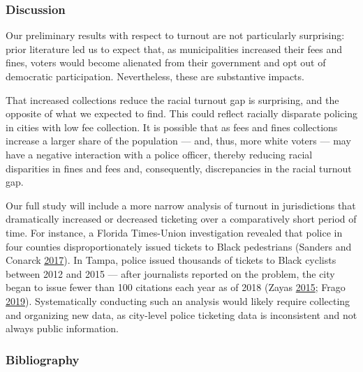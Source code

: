 \documentclass[
  12pt,
]{article}
\begin{document}
\hypertarget{discussion}{%
\subsubsection*{Discussion}\label{discussion}}

Our preliminary results with respect to turnout are not particularly surprising: prior literature led us to expect that, as municipalities increased their fees and fines, voters would become alienated from their government and opt out of democratic participation. Nevertheless, these are substantive impacts.

That increased collections reduce the racial turnout gap is surprising, and the opposite of what we expected to find. This could reflect racially disparate policing in cities with low fee collection. It is possible that as fees and fines collections increase a larger share of the population --- and, thus, more white voters --- may have a negative interaction with a police officer, thereby reducing racial disparities in fines and fees and, consequently, discrepancies in the racial turnout gap.

Our full study will include a more narrow analysis of turnout in jurisdictions that dramatically increased or decreased ticketing over a comparatively short period of time. For instance, a Florida Times-Union investigation revealed that police in four counties disproportionately issued tickets to Black pedestrians (Sanders and Conarck \protect\hyperlink{ref-Sanders2017}{2017}). In Tampa, police issued thousands of tickets to Black cyclists between 2012 and 2015 --- after journalists reported on the problem, the city began to issue fewer than 100 citations each year as of 2018 (Zayas \protect\hyperlink{ref-Zayas2015}{2015}; Frago \protect\hyperlink{ref-Frago2019}{2019}). Systematically conducting such an analysis would likely require collecting and organizing new data, as city-level police ticketing data is inconsistent and not always public information.

\newpage

\hypertarget{bibliography}{%
\subsubsection*{Bibliography}\label{bibliography}}
\end{document}
